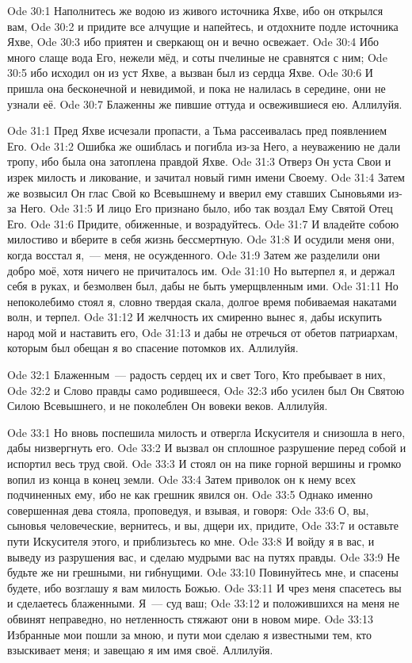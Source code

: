 \vs Ode 30:1
Наполнитесь же
водою из живого источника Яхве, ибо он открылся вам,
\vs Ode 30:2
и придите все
алчущие и напейтесь, и отдохните подле источника Яхве,
\vs Ode 30:3
ибо приятен и
сверкающ он и вечно освежает.
\vs Ode 30:4
Ибо много
слаще вода Его, нежели мёд, и соты пчелиные не сравнятся с ним;
\vs Ode 30:5
ибо исходил он
из уст Яхве, а вызван был из сердца Яхве.
\vs Ode 30:6
И пришла она
бесконечной и невидимой, и пока не налилась в середине, они не узнали её.
\vs Ode 30:7
Блаженны же
пившие оттуда и освежившиеся ею.
Аллилуйя.

\vs Ode 31:1
Пред Яхве
исчезали пропасти, а Тьма рассеивалась пред появлением Его.
\vs Ode 31:2
Ошибка же
ошиблась и погибла из-за Него, а неуважению не дали тропу, ибо была она
затоплена правдой Яхве.
\vs Ode 31:3
Отверз Он уста
Свои и изрек милость и ликование, и зачитал новый гимн имени Своему.
\vs Ode 31:4
Затем же
возвысил Он глас Свой ко Всевышнему и вверил ему ставших Сыновьями из-за Него.
\vs Ode 31:5
И лицо Его
признано было, ибо так воздал Ему Святой Отец Его.
\vs Ode 31:6
Придите,
обиженные, и возрадуйтесь.
\vs Ode 31:7
И владейте
собою милостиво и вберите в себя жизнь бессмертную.
\vs Ode 31:8
И осудили меня
они, когда восстал я,~--- меня, не осужденного.
\vs Ode 31:9
Затем же
разделили они добро моё, хотя ничего не причиталось им.
\vs Ode 31:10
Но вытерпел
я, и держал себя в руках, и безмолвен был, дабы не быть умерщвленным ими.
\vs Ode 31:11
Но
непоколебимо стоял я, словно твердая скала, долгое время побиваемая накатами
волн, и терпел.
\vs Ode 31:12
И желчность
их смиренно вынес я, дабы искупить народ мой и наставить его,
\vs Ode 31:13
и дабы не
отречься от обетов патриархам, которым был обещан я во спасение потомков их.
Аллилуйя.

\vs Ode 32:1
Блаженным~---
радость сердец их и свет Того, Кто пребывает в них,
\vs Ode 32:2
и Слово правды
само родившееся,
\vs Ode 32:3
ибо усилен был
Он Святою Силою Всевышнего, и не поколеблен Он вовеки веков.
Аллилуйя.

\vs Ode 33:1
Но вновь
поспешила милость и отвергла Искусителя и снизошла в него, дабы низвергнуть его.
\vs Ode 33:2
И вызвал он
сплошное разрушение перед собой и испортил весь труд свой.
\vs Ode 33:3
И стоял он на
пике горной вершины и громко вопил из конца в конец земли.
\vs Ode 33:4
Затем приволок
он к нему всех подчиненных ему, ибо не как грешник явился он.
\vs Ode 33:5
Однако именно
совершенная дева стояла, проповедуя, и взывая, и говоря:
\vs Ode 33:6
О, вы, сыновья
человеческие, вернитесь, и вы, дщери их, придите,
\vs Ode 33:7
и оставьте
пути Искусителя этого, и приблизьтесь ко мне.
\vs Ode 33:8
И войду я в
вас, и выведу из разрушения вас, и сделаю мудрыми вас на путях правды.
\vs Ode 33:9
Не будьте же
ни грешными, ни гибнущими.
\vs Ode 33:10
Повинуйтесь
мне, и спасены будете, ибо возглашу я вам милость Божью.
\vs Ode 33:11
И чрез меня
спасетесь вы и сделаетесь блаженными. Я~--- суд ваш;
\vs Ode 33:12
и
положившихся на меня не обвинят неправедно, но нетленность стяжают они в новом
мире.
\vs Ode 33:13
Избранные мои
пошли за мною, и пути мои сделаю я известными тем, кто взыскивает меня; и
завещаю я им имя своё.
Аллилуйя.

